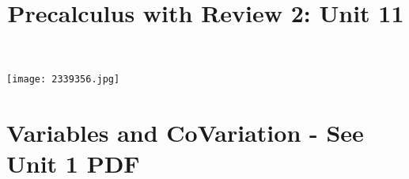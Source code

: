 \documentclass[handout]{xourse}
\title{Precalculus with Review 2: Unit 11}
\begin{document}
\texttt{[image: 2339356.jpg]}
\maketitle


	





\part{Variables and CoVariation - See Unit 1 PDF}  %
%
%
%
%
%
%
%
%
\end{document}
